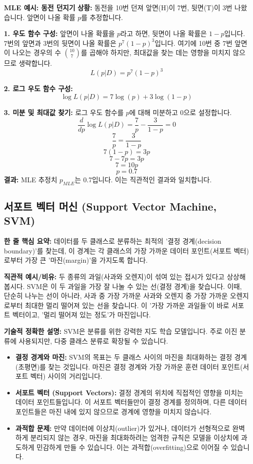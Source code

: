 \documentclass[11pt,a4paper]{article}
\begin{document}
\begin{examplebox}
\textbf{MLE 예시: 동전 던지기}
\textbf{상황:} 동전을 10번 던져 앞면(H)이 7번, 뒷면(T)이 3번 나왔습니다. 앞면이 나올 확률 $p$를 추정합니다.

\textbf{1. 우도 함수 구성:}
앞면이 나올 확률을 $p$라고 하면, 뒷면이 나올 확률은 $1-p$입니다.
7번의 앞면과 3번의 뒷면이 나올 확률은 $p^7 (1-p)^3$입니다.
여기에 10번 중 7번 앞면이 나오는 경우의 수 $\binom{10}{7}$를 곱해야 하지만, 최대값을 찾는 데는 영향을 미치지 않으므로 생략합니다.
$$ L(p|D) = p^7 (1-p)^3 $$

\textbf{2. 로그 우도 함수 구성:}
$$ \log L(p|D) = 7 \log(p) + 3 \log(1-p) $$

\textbf{3. 미분 및 최대값 찾기:}
로그 우도 함수를 $p$에 대해 미분하고 0으로 설정합니다.
$$ \frac{d}{dp} \log L(p|D) = \frac{7}{p} - \frac{3}{1-p} = 0 $$
$$ \frac{7}{p} = \frac{3}{1-p} $$
$$ 7(1-p) = 3p $$
$$ 7 - 7p = 3p $$
$$ 7 = 10p $$
$$ p = 0.7 $$
\textbf{결과:} MLE 추정치 $p_{MLE}$는 0.7입니다. 이는 직관적인 결과와 일치합니다.
\end{examplebox}

\newpage
\subsection{서포트 벡터 머신 (Support Vector Machine, SVM)}

\begin{conceptbox}
\textbf{한 줄 핵심 요약:} 데이터를 두 클래스로 분류하는 최적의 '결정 경계(decision boundary)'를 찾는데, 이 경계는 각 클래스의 가장 가까운 데이터 포인트(서포트 벡터)로부터 가장 큰 '마진(margin)'을 가지도록 합니다.
\end{conceptbox}

\textbf{직관적 예시/비유:}
두 종류의 과일(사과와 오렌지)이 섞여 있는 접시가 있다고 상상해 봅시다. SVM은 이 두 과일을 가장 잘 나눌 수 있는 선(결정 경계)을 찾습니다. 이때, 단순히 나누는 선이 아니라, 사과 중 가장 가까운 사과와 오렌지 중 가장 가까운 오렌지로부터 최대한 멀리 떨어져 있는 선을 찾습니다. 이 '가장 가까운 과일들'이 바로 서포트 벡터이고, '멀리 떨어져 있는 정도'가 마진입니다.

\textbf{기술적 정확한 설명:}
SVM은 분류를 위한 강력한 지도 학습 모델입니다. 주로 이진 분류에 사용되지만, 다중 클래스 분류로 확장될 수 있습니다.

\begin{itemize}
    \item \textbf{결정 경계와 마진:} SVM의 목표는 두 클래스 사이의 마진을 최대화하는 결정 경계(초평면)를 찾는 것입니다. 마진은 결정 경계와 가장 가까운 훈련 데이터 포인트(서포트 벡터) 사이의 거리입니다.
    \item \textbf{서포트 벡터 (Support Vectors):} 결정 경계의 위치에 직접적인 영향을 미치는 데이터 포인트들입니다. 이 서포트 벡터들만이 결정 경계를 정의하며, 다른 데이터 포인트들은 마진 내에 있지 않으므로 경계에 영향을 미치지 않습니다.
    \item \textbf{과적합 문제:} 만약 데이터에 이상치(outlier)가 있거나, 데이터가 선형적으로 완벽하게 분리되지 않는 경우, 마진을 최대화하려는 엄격한 규칙은 모델을 이상치에 과도하게 민감하게 만들 수 있습니다. 이는 과적합(overfitting)으로 이어질 수 있습니다.
\end{itemize}
\end{document}
